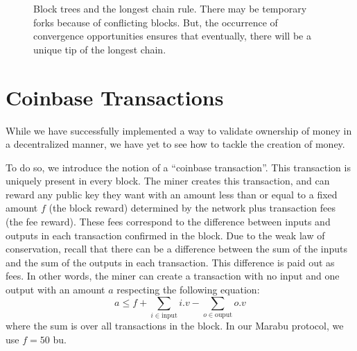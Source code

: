 \begin{figure}[H]
	\caption{Block trees and the longest chain rule. There may be temporary forks because of conflicting blocks. But, the occurrence of convergence opportunities ensures that eventually, there will be a unique tip of the longest chain.}
	\label{fig:Block tree}  %
\end{figure}

\section{Coinbase Transactions}

While we have successfully implemented a way to validate ownership of money in a decentralized manner, we have yet to see how to tackle the creation of money.

To do so, we introduce the notion of a ``coinbase transaction''. This transaction is uniquely present in every block. The miner creates this transaction, and can reward any public key they want with an amount less than or equal to a fixed amount $f$ (the block reward) determined by the network plus transaction fees (the fee reward). These fees correspond to the difference between inputs and outputs in each transaction confirmed in the block. Due to the weak law of conservation, recall that there can be a difference between the sum of the inputs and the sum of the outputs in each transaction. This difference is paid out as fees. In other words, the miner can create a transaction with no input and one output with an amount $a$ respecting the following equation:
\begin{equation}
    a \leq f + \sum_{i \in {\text{input}}} i.v - \sum_{o \in {\text{ouput}}} o.v
\end{equation}
where the sum is over all transactions in the block.
In our Marabu protocol, we use $f = 50$ bu.

